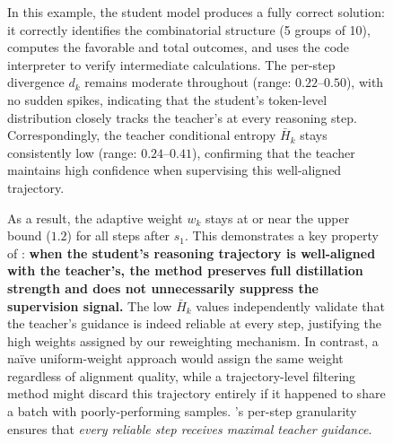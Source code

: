 \begin{figure}[t]
\begin{tcolorbox}
{\begin{tabular}{@{} c p{0.64\linewidth} c c c @{}}
\bottomrule
\end{tabular}
}

\vspace{8pt}

\begin{tcolorbox}[
  colback=green!4, colframe=green!50!black, boxrule=0.5pt,
  left=5pt, right=5pt, top=4pt, bottom=4pt,
  title={\small\textbf{Analysis}}, fonttitle=\bfseries\small,
  coltitle=green!50!black, colbacktitle=green!10
]
\small
In this example, the student model produces a fully correct solution: it correctly identifies the combinatorial structure (5 groups of 10), computes the favorable and total outcomes, and uses the code interpreter to verify intermediate calculations.
The per-step divergence $d_k$ remains moderate throughout (range: $0.22$--$0.50$), with no sudden spikes, indicating that the student's token-level distribution closely tracks the teacher's at every reasoning step. Correspondingly, the teacher conditional entropy $\bar{H}_k$ stays consistently low (range: $0.24$--$0.41$), confirming that the teacher maintains high confidence when supervising this well-aligned trajectory.

As a result, the adaptive weight $w_k$ stays at or near the upper bound ($1.2$) for all steps after $s_1$.
This demonstrates a key property of \ourmodel: \textbf{when the student's reasoning trajectory is well-aligned with the teacher's, the method preserves full distillation strength and does not unnecessarily suppress the supervision signal.} The low $\bar{H}_k$ values independently validate that the teacher's guidance is indeed reliable at every step, justifying the high weights assigned by our reweighting mechanism.
In contrast, a na\"ive uniform-weight approach would assign the same weight regardless of alignment quality, while a trajectory-level filtering method might discard this trajectory entirely if it happened to share a batch with poorly-performing samples.
\ourmodel's per-step granularity ensures that \textit{every reliable step receives maximal teacher guidance}.
\end{tcolorbox}

\end{tcolorbox}


\label{fig:case-study-a}
\end{figure}















